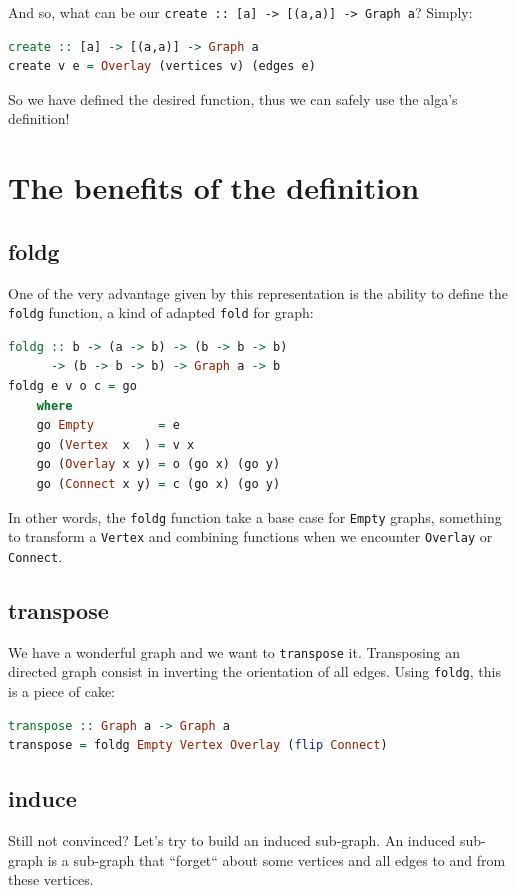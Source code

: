 \documentclass[10pt,a4paper]{article}
\begin{document}
And so, what can be our \verb|create :: [a] -> [(a,a)] -> Graph a|? Simply:
\begin{lstlisting}[language=Haskell, frame=single]
create :: [a] -> [(a,a)] -> Graph a
create v e = Overlay (vertices v) (edges e)
\end{lstlisting}

So we have defined the desired function, thus we can safely use the alga's definition!

\section{The benefits of the definition}
\subsection{foldg}
One of the very advantage given by this representation is the ability to define the \verb|foldg| function, a kind of adapted \verb|fold| for graph:
\begin{lstlisting}[language=Haskell, frame=single]
foldg :: b -> (a -> b) -> (b -> b -> b)
      -> (b -> b -> b) -> Graph a -> b
foldg e v o c = go
	where
	go Empty         = e
	go (Vertex  x  ) = v x
	go (Overlay x y) = o (go x) (go y)
	go (Connect x y) = c (go x) (go y)
\end{lstlisting}
In other words, the \verb|foldg| function take a base case for \verb|Empty| graphs, something to transform a \verb|Vertex| and combining functions when we encounter \verb|Overlay| or \verb|Connect|.

\subsection{transpose}

We have a wonderful graph and we want to \verb|transpose| it. Transposing an directed graph consist in inverting the orientation of all edges. Using \verb|foldg|, this is a piece of cake:

\begin{lstlisting}[language=Haskell, frame=single]
transpose :: Graph a -> Graph a
transpose = foldg Empty Vertex Overlay (flip Connect)
\end{lstlisting}

\subsection{induce}

Still not convinced? Let's try to build an induced sub-graph. An induced sub-graph is a sub-graph that ``forget`` about some vertices and all edges to and from these vertices.
\end{document}
